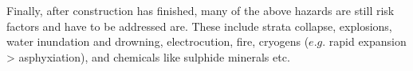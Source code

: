 Finally, after construction has finished, many of the above hazards are still risk factors and have to be addressed are. These include strata collapse, explosions, water inundation and drowning, electrocution, fire, cryogens ($e.g.$ rapid expansion > asphyxiation), and chemicals like sulphide minerals etc.   
 

 
 
\FloatBarrier
